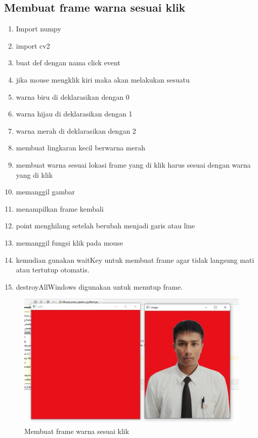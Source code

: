 \newpage
\subsection{Membuat frame warna sesuai klik}

\begin{enumerate}
	\item Import numpy
	\item import cv2
	\item buat def dengan nama click event
	\item jika mouse mengklik kiri maka akan melakukan sesuatu
	\item warna biru di deklarasikan dengan 0
	\item warna hijau di deklarasikan dengan 1
	\item warna merah di deklarasikan dengan 2
	\item membuat lingkaran kecil berwarna merah
	\item membuat warna sesuai lokasi frame yang di klik harus sesuai dengan warna yang di klik
	\item memanggil gambar
	\item menampilkan frame kembali
	\item point menghilang setelah berubah menjadi garis atau line
	\item memanggil fungsi klik pada mouse
	\item kemudian gunakan waitKey untuk membuat frame agar tidak langsung mati atau tertutup otomatis.
	\item destroyAllWindows digunakan untuk menutup frame.

\end{enumerate}

\begin{figure}[ht]
\centering
\includegraphics[scale=0.45]{figures/2,24.jpg}
\caption{Membuat frame warna sesuai klik}
\label{contoh}
\end{figure}

